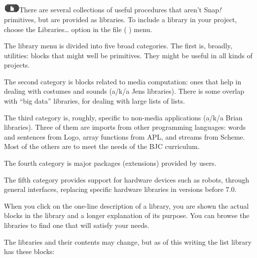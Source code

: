 \label{libraries-1}{}\includegraphics[width=0.31944in,height=0.18056in]{media/image384.png}There
are several collections of useful procedures that aren't Snap\emph{!}
primitives, but are provided as libraries. To include a library in your
project, choose the Libraries\ldots{} option in the file ( ) menu.

The library menu is divided into five broad categories. The first is,
broadly, utilities: blocks that might well be primitives. They might be
useful in all kinds of projects.

The second category is blocks related to media computation: ones that
help in dealing with costumes and sounds (a/k/a Jens libraries). There
is some overlap with ``big data'' libraries, for dealing with large
lists of lists.

The third category is, roughly, specific to non-media applications
(a/k/a Brian libraries). Three of them are imports from other
programming languages: words and sentences from Logo, array functions
from APL, and streams from Scheme. Most of the others are to meet the
needs of the BJC curriculum.

The fourth category is major packages (extensions) provided by users.

The fifth category provides support for hardware devices such as robots,
through general interfaces, replacing specific hardware libraries in
versions before 7.0.

When you click on the one-line description of a library, you are shown
the actual blocks in the library and a longer explanation of its
purpose. You can browse the libraries to find one that will satisfy your
needs.

The libraries and their contents may change, but as of this writing the
list library has these blocks:

